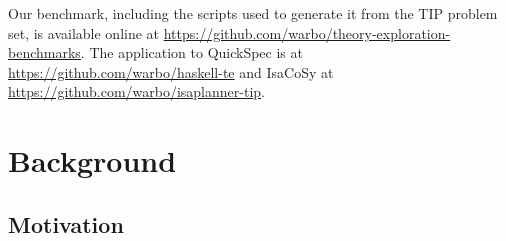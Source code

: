 \begin{sloppypar}
  Our benchmark, including the scripts used to generate it from the TIP problem
  set, is available online at
  \url{https://github.com/warbo/theory-exploration-benchmarks}. The application
  to QuickSpec is at \url{https://github.com/warbo/haskell-te} and IsaCoSy at
  \url{https://github.com/warbo/isaplanner-tip}.
\end{sloppypar}



\section{Background}
\label{sec:background}

\subsection{Motivation}
\label{sec:motivation}



